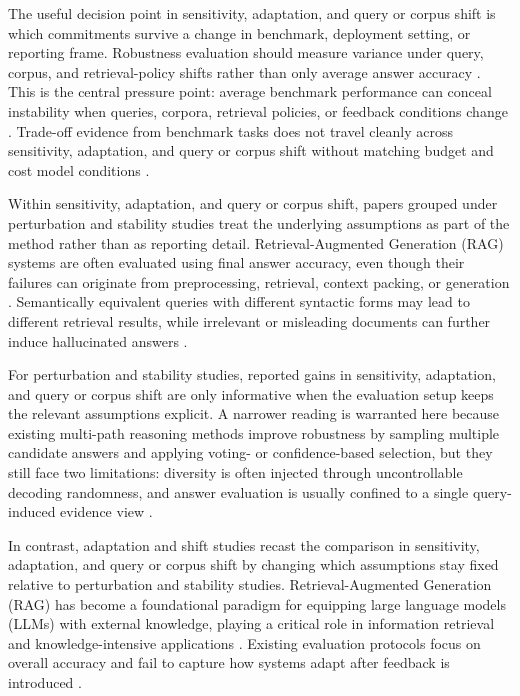 \documentclass[a4paper,11pt]{article}
\begin{document}
The useful decision point in sensitivity, adaptation, and query or corpus shift is which commitments survive a change in benchmark, deployment setting, or reporting frame. Robustness evaluation should measure variance under query, corpus, and retrieval-policy shifts rather than only average answer accuracy \citep{Sun2026Robust,Muthyam2026Systems,Li2026Mrag,Bang2026Feedback}. This is the central pressure point: average benchmark performance can conceal instability when queries, corpora, retrieval policies, or feedback conditions change \citep{Sun2026Robust,Muthyam2026Systems,Li2026Mrag,Bang2026Feedback}. Trade-off evidence from benchmark tasks does not travel cleanly across sensitivity, adaptation, and query or corpus shift without matching budget and cost model conditions \citep{Sun2026Robust}.

Within sensitivity, adaptation, and query or corpus shift, papers grouped under perturbation and stability studies treat the underlying assumptions as part of the method rather than as reporting detail. Retrieval-Augmented Generation (RAG) systems are often evaluated using final answer accuracy, even though their failures can originate from preprocessing, retrieval, context packing, or generation \citep{Muthyam2026Systems}. Semantically equivalent queries with different syntactic forms may lead to different retrieval results, while irrelevant or misleading documents can further induce hallucinated answers \citep{Sun2026Robust}.

For perturbation and stability studies, reported gains in sensitivity, adaptation, and query or corpus shift are only informative when the evaluation setup keeps the relevant assumptions explicit. A narrower reading is warranted here because existing multi-path reasoning methods improve robustness by sampling multiple candidate answers and applying voting- or confidence-based selection, but they still face two limitations: diversity is often injected through uncontrollable decoding randomness, and answer evaluation is usually confined to a single query-induced evidence view \citep{Sun2026Robust}.

In contrast, adaptation and shift studies recast the comparison in sensitivity, adaptation, and query or corpus shift by changing which assumptions stay fixed relative to perturbation and stability studies. Retrieval-Augmented Generation (RAG) has become a foundational paradigm for equipping large language models (LLMs) with external knowledge, playing a critical role in information retrieval and knowledge-intensive applications \citep{Su2025Dynamic}. Existing evaluation protocols focus on overall accuracy and fail to capture how systems adapt after feedback is introduced \citep{Bang2026Feedback}.
\end{document}
